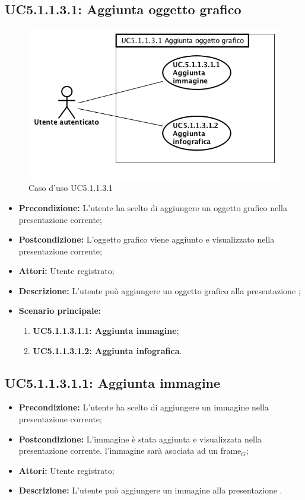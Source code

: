 \subsection{ UC5.1.1.3.1: Aggiunta oggetto grafico}

\begin{figure}[h]
	\begin{center}
	\includegraphics[scale=0.4]{diagram/UC5-1-1-3-1.png}
	\caption{Caso d'uso UC5.1.1.3.1}
	\end{center}
\end{figure}
\begin{itemize}
	\item \textbf{Precondizione:} L'utente ha scelto di aggiungere un oggetto grafico nella presentazione corrente;
	\item \textbf{Postcondizione:} L'oggetto grafico viene aggiunto e visualizzato nella presentazione corrente;
	\item \textbf{Attori:} Utente registrato;
	\item \textbf{Descrizione:} L'utente può aggiungere un oggetto grafico alla presentazione ;
	\item \textbf{Scenario principale:}
	\begin{enumerate}
		\item \textbf{ UC5.1.1.3.1.1: Aggiunta immagine};
		\item \textbf{ UC5.1.1.3.1.2: Aggiunta infografica}.
	\end{enumerate}
\end{itemize}
\subsection{ UC5.1.1.3.1.1: Aggiunta immagine}

\begin{itemize}
	\item \textbf{Precondizione:} L'utente ha scelto di aggiungere un immagine nella presentazione corrente;
	\item \textbf{Postcondizione:} L'immagine è stata aggiunta e visualizzata nella presentazione corrente. l'immagine sarà asociata ad un frame$_G$;
	\item \textbf{Attori:} Utente registrato;
	\item \textbf{Descrizione:} L'utente può aggiungere un immagine alla presentazione .
\end{itemize}

